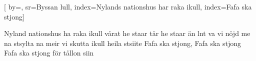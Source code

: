 

[ 		%
	by={},					%
	sr={Byssan lull},					%
	index={Nylands nationshus har raka ikull}, %
	index={Fafa ska stjong}]						%
	

\beginverse*						%
Nyland nationshus ha raka ikull
vårat he staar tär he staar än
lnt va vi nöjd me na stsylta na meir
vi skutta ikull heila stsiite
Fafa ska stjong, Fafa ska stjong
Fafa ska stjong för tållon siin
\endverse							%

\endsong							%